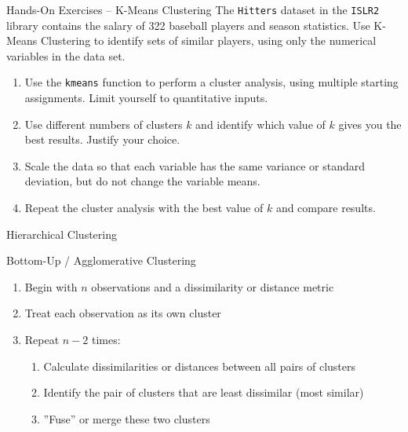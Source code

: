 \documentclass[ignorenonframetext,xcolor=x11names]{beamer}
\begin{document}
\begin{frame}{Hands-On Exercises -- K-Means Clustering}
The \texttt{Hitters} dataset in the \texttt{ISLR2} library contains the salary of 322 baseball players and season statistics. Use K-Means Clustering to identify sets of similar players, using only the numerical variables in the data set.

\begin{enumerate}
   \item Use the \texttt{kmeans} function to perform a cluster analysis, using multiple starting assignments. Limit yourself to quantitative inputs.
   \item Use different numbers of clusters $k$ and identify which value of $k$ gives you the best results. Justify your choice.
   \item Scale the data so that each variable has the same variance or standard deviation, but do not change the variable means. 
   \item Repeat the cluster analysis with the best value of $k$ and compare results.\end{enumerate}
\end{frame}

\begin{frame}{Hierarchical Clustering}
\begin{block}{Bottom-Up / Agglomerative Clustering}
\begin{enumerate}
   \item Begin with $n$ observations and a dissimilarity or distance metric
   \item Treat each observation as its own cluster
   \item Repeat $n-2$ times:
   \begin{enumerate}
      \normalsize
      \item Calculate dissimilarities or distances between all pairs of clusters
      \item Identify the pair of clusters that are least dissimilar (most similar)
      \item ''Fuse'' or merge these two clusters
   \end{enumerate}
\end{enumerate}
\end{block}
\end{frame}
\end{document}
